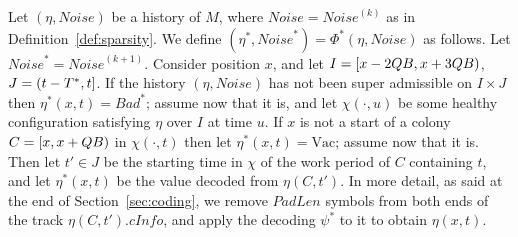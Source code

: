\documentclass[12pt]{memoir}
\newcommand{\fld}[1]{\ensuremath{\textit{#1}}}
\def\B{B}
\newcommand{\Bad}{\mathit{Bad}}
\newcommand{\Noise}{\mathit{Noise}}
\newcommand{\Tus}{T^{*}}
\newcommand{\cInfo}{\fld{cInfo}}
\newcommand{\PadLen}{\mathit{PadLen}}
\newcommand{\Vacant}{\mathrm{Vac}}
\begin{document}
\begin{definition}\label{def:damage-scaleup}
Let \( (\eta,\Noise) \) be a history of \( M \), where \( \Noise=\Noise^{(k)} \)
as in Definition~\ref{def:sparsity}.
We define \( (\eta^{*},\Noise^{*})=\Phi^{*}(\eta,\Noise) \) as follows.
Let \( \Noise^{*}=\Noise^{{(k+1)}} \).
Consider position \( x \), and let \( I=[x-2QB,x+3QB) \),
\( J=\rint{t-\Tus}{t} \).
If the history \( (\eta,\Noise) \) has not been super admissible on \( I\times J \)
then \( \eta^{*}(x,t)=\Bad^{*} \); assume now that it is, and let
\( \chi(\cdot,u) \) be some healthy configuration satisfying \( \eta \) over 
\( I \) at time \( u \).
If \( x \) is not a start of a colony \( C=\lint{x}{x+Q\B} \) in \( \chi(\cdot,t) \)
then let \( \eta^{*}(x,t)=\Vacant \); assume now that it is.
Then let \( t'\in J \) be the starting time in \( \chi \) of the work period of \( C \)
containing \( t \),
and let \( \eta^{*}(x,t) \) be the value decoded from \( \eta(C,t') \).
In more detail, as said at the end of Section~\ref{sec:coding}, 
we remove \( \PadLen \) symbols from both ends of 
the track \( \eta(C,t').\cInfo \), and apply 
the decoding \( \psi^{*} \) to it to obtain \( \eta(x,t) \).
\end{definition}




\end{document}
